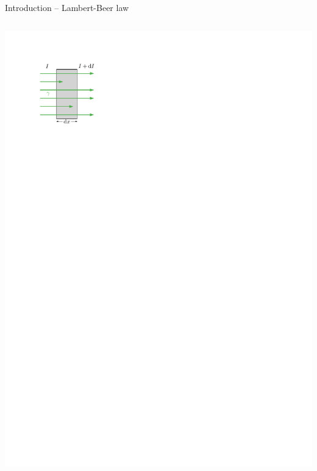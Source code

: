 \documentclass[11pt,xcolor=dvipsnames,professionalfonts]{beamer}
\begin{document}
\begin{frame}{Introduction -- Lambert-Beer law}
\begin{columns}
			\begin{center}
				\includegraphics{./figures/lambert_beer.pdf}
			\end{center}			
	\end{columns}
\end{frame}

\end{document}
